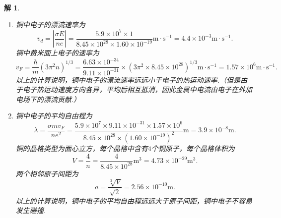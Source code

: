 \documentclass[UTF8,10pt,a4paper]{article}
\theoremstyle{Problem}
\theoremstyle{Solution}
\newtheorem*{sol}{解}
\providecommand{\abs}[1]{\left\lvert#1\right\rvert}
\begin{document}
\begin{sol}
    \begin{enumerate}
        \item[(i)] 铜中电子的漂流速率为
        \begin{equation}
            v_d=\abs{\frac{\sigma E}{ne}}=\frac{5.9\times 10^7\times 1}{8.45\times 10^{28}\times 1.60\times 10^{-19}}\text{m}\cdot\text{s}^{-1}=4.4\times 10^{-3}\text{m}\cdot\text{s}^{-1}.
        \end{equation}
        铜中费米面上电子的速率为
        \begin{equation}
            v_F=\frac{\hbar}{m}(3\pi^2n)^{1/3}=\frac{6.63\times 10^{-34}}{9.11\times 10^{-31}}\times(3\pi^2\times 8.45\times 10^{28})^{1/3}\text{m}\cdot\text{s}^{-1}=1.57\times 10^6\text{m}\cdot\text{s}^{-1}.
        \end{equation}
        以上的计算说明，铜中电子的漂流速率远远小于电子的热运动速率.（但是由于电子热运动速度方向各异，平均后相互抵消，因此金属中电流由电子在外加电场下的漂流贡献.）
        \item[(ii)] 铜中电子的平均自由程为
        \begin{equation}
            \lambda=\frac{\sigma mv_F}{ne^2}=\frac{5.9\times 10^7\times 9.11\times 10^{-31}\times 1.57\times 10^6}{8.45\times 10^{28}\times(1.60\times 10^{-19})^2}\text{m}=3.9\times 10^{-8}\text{m}.
        \end{equation}
        铜的晶格类型为面心立方，每个晶格中含有$4$个铜原子，每个晶格体积为
        \begin{equation}
            V=\frac{4}{n}=\frac{4}{8.45\times 10^{28}}\text{m}^3=4.73\times 10^{-29}\text{m}^3.
        \end{equation}
        两个相邻原子间距为
        \begin{equation}
            a=\frac{\sqrt[3]{V}}{\sqrt{2}}=2.56\times 10^{-10}\text{m}.
        \end{equation}
        以上的计算说明，铜中电子的平均自由程远远大于原子间距，铜中电子不容易发生碰撞.
    \end{enumerate}
\end{sol}
\end{document}
